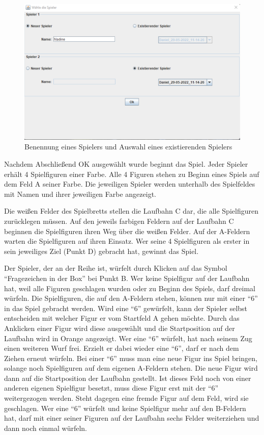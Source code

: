 \begin{figure}[htbp]
\centering
\centerline{\includegraphics[scale=.6]{anleitung4}}
\caption{Benennung eines Spielers und Auswahl eines existierenden Spielers}
\label{fig:anleitung4}
\end{figure}

\noindent Nachdem Abschließend OK ausgewählt wurde beginnt das Spiel. Jeder Spieler erhält 4 Spielfiguren einer Farbe. Alle 4 Figuren stehen zu Beginn eines Spiels auf dem Feld A seiner Farbe. Die jeweiligen Spieler werden unterhalb des Spielfeldes mit Namen und ihrer jeweiligen Farbe angezeigt.

Die weißen Felder des Spielbretts stellen die Laufbahn C dar, die alle Spielfiguren zurücklegen müssen. Auf den jeweils farbigen Feldern auf der Laufbahn C beginnen die Spielfiguren ihren Weg über die weißen Felder. Auf der A-Feldern warten die Spielfiguren auf ihren Einsatz. Wer seine 4 Spielfiguren als erster in sein jeweiliges Ziel (Punkt D) gebracht hat, gewinnt das Spiel.

\newpage

\noindent Der Spieler, der an der Reihe ist, würfelt durch Klicken auf das Symbol \enquote{Fragezeichen in der Box} bei Punkt B. Wer keine Spielfigur auf der Laufbahn hat, weil alle Figuren geschlagen wurden oder zu Beginn des Spiels, darf dreimal würfeln. Die Spielfiguren, die auf den A-Feldern stehen, können nur mit einer \enquote{6} in das Spiel gebracht werden. Wird eine \enquote{6} gewürfelt, kann der Spieler selbst entscheiden mit welcher Figur er vom Startfeld A gehen möchte. Durch das Anklicken einer Figur wird diese ausgewählt und die Startposition auf der Laufbahn wird in Orange angezeigt. Wer eine \enquote{6} würfelt, hat nach seinem Zug einen weiteren Wurf frei. Erzielt er dabei wieder eine \enquote{6}, darf er nach dem Ziehen erneut würfeln. Bei einer \enquote{6} muss man eine neue Figur ins Spiel bringen, solange noch Spielfiguren auf dem eigenen A-Feldern stehen. Die neue Figur wird dann auf die Startposition der Laufbahn gestellt. Ist dieses Feld noch von einer anderen eigenen Spielfigur besetzt, muss diese Figur erst mit der \enquote{6} weitergezogen werden. Steht dagegen eine fremde Figur auf dem Feld, wird sie geschlagen. Wer eine \enquote{6} würfelt und keine Spielfigur mehr auf den B-Feldern hat, darf mit einer seiner Figuren auf der Laufbahn sechs Felder weiterziehen und dann noch einmal würfeln.

